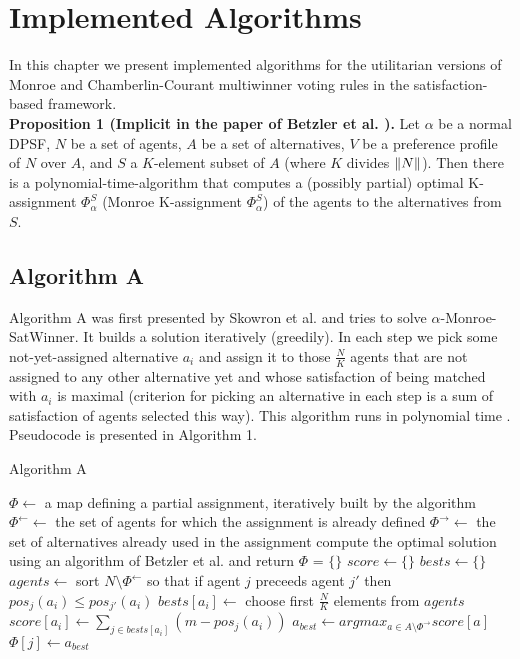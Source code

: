\chapter{Implemented Algorithms}
\label{cha:implementedAlgorithms}

In this chapter we present implemented algorithms for the utilitarian versions of Monroe and Chamberlin-Courant multiwinner voting rules in the satisfaction-based framework.
\\

\noindent
\textbf{Proposition 1 (Implicit in the paper of Betzler et al. \cite{3}).} Let $\alpha$ be a normal DPSF, $N$ be a set of agents, $A$ be a set of alternatives, $V$ be a preference profile of $N$ over $A$, and $S$ a $K$-element subset of $A$ (where $K$ divides $\lVert N\rVert$). Then there is a polynomial-time-algorithm that computes a (possibly partial) optimal K-assignment $\Phi^{S}_{\alpha}$ (Monroe K-assignment $\Phi^{S}_{\alpha}$) of the agents to the alternatives from $S$.
\\

\section{Algorithm A}

Algorithm A was first presented by Skowron et al. \cite{1} and tries to solve $\alpha$-Monroe-SatWinner. It builds a solution iteratively (greedily). In each step we pick some not-yet-assigned alternative $a_{i}$ and assign it to those $\frac{N}{K}$ agents that are not assigned to any other alternative yet and whose satisfaction of being matched with $a_{i}$ is maximal (criterion for picking an alternative in each step is a sum of satisfaction of agents selected this way). This algorithm runs in polynomial time \cite{1}. Pseudocode is presented in Algorithm 1.

\begin{algorithm}
\caption{Algorithm A}\label{euclid}
\begin{algorithmic}[1]
		\State $\Phi \gets$ a map defining a partial assignment, iteratively built by the algorithm
		\State $\Phi^{\leftarrow} \gets$ the set of agents for which the assignment is already defined
		\State $\Phi^{\rightarrow} \gets$ the set of alternatives already used in the assignment
			\State compute the optimal solution using an algorithm of Betzler et al. \cite{1} and return
		\EndIf
		\State $\Phi$ = $\{\}$
			\State $score \gets \{\}$
			\State $bests \gets \{\}$
				\State $agents \gets$ sort $N \setminus \Phi^{\leftarrow}$ so that if agent $j$ preceeds agent $j'$ then $pos_{j}(a_{i}) \leq pos_{j'}(a_{i})$
				\State $bests[a_{i}] \gets$ choose first $\frac{N}{K}$ elements from $agents$
				\State $score[a_{i}] \gets \sum_{j \in bests[a_{i}]}(m - pos_{j}(a_{i}))$
			\EndFor
			\State $a_{best} \gets argmax_{a \in A \setminus \Phi^{\rightarrow}} score[a]$
				\State $\Phi[j] \gets a_{best}$
			\EndFor
		\EndFor
	\EndProcedure
\end{algorithmic}
\end{algorithm}

